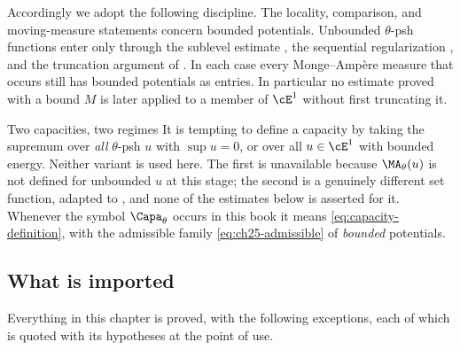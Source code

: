 Accordingly we adopt the following discipline.  The locality, comparison,
and moving-measure statements concern bounded potentials.  Unbounded
$\theta$-psh functions enter only through the sublevel estimate
, the sequential regularization
, and the truncation argument of
.  In each case every Monge--Amp\`ere measure that occurs
still has bounded potentials as entries.  In particular no estimate proved
with a bound $M$ is later applied to a member of $\cE^1$ without first
truncating it.

\begin{warning}{Two capacities, two regimes}
It is tempting to define a capacity by taking the supremum over
\emph{all} $\theta$-psh $u$ with $\sup u=0$, or over all
$u\in\cE^1$ with bounded energy.  Neither variant is used here.  The first
is unavailable because $\MA_\theta(u)$ is not defined for unbounded $u$ at
this stage; the second is a genuinely different set
function, adapted to , and none of the
estimates below is asserted for it.  Whenever the symbol $\Capa_\theta$
occurs in this book it means \eqref{eq:capacity-definition}, with the
admissible family \eqref{eq:ch25-admissible} of \emph{bounded} potentials.
\end{warning}

\subsection{What is imported}
\label{sec:ch25-imported}

Everything in this chapter is proved, with the following exceptions, each of
which is quoted with its hypotheses at the point of use.


